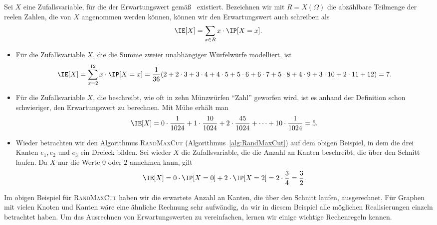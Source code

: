 \documentclass[language=ngerman,algolist]{TemplateLecture}
\begin{document}
Sei $X$ eine Zufallsvariable, für die der Erwartungswert gemäß~ existiert. Bezeichnen wir mit $R = X(\Omega)$ die abzählbare Teilmenge der reelen Zahlen, die von $X$ angenommen werden können, können wir den Erwartungswert auch schreiben als
\begin{equation*}
    \IE[X] = \sum_{x \in R} x \cdot \IP[X = x].
\end{equation*}
\begin{expl}\leavevmode
    \begin{itemize}
        \item Für die Zufallsvariable $X$, die die Summe zweier unabhängiger Würfelwürfe modelliert, ist
        \begin{equation*}
            \IE[X] = \sum_{x=2}^{12} x \cdot \IP[X = x] = \frac{1}{36}(2 + 2 \cdot 3 + 3 \cdot 4 + 4 \cdot 5 + 5 \cdot 6 + 6 \cdot 7 + 5 \cdot 8 + 4 \cdot 9 + 3 \cdot 10 + 2 \cdot 11 + 12) = 7.
        \end{equation*}
        \item Für die Zufallsvariable $X$, die beschreibt, wie oft in zehn Münzwürfen \enquote{Zahl} geworfen wird, ist es anhand der Definition schon schwieriger, den Erwartungswert zu berechnen. Mit Mühe erhält man 
        \begin{equation*}
            \IE[X] = 0 \cdot \frac{1}{1024} + 1 \cdot \frac{10}{1024} + 2 \cdot \frac{45}{1024} + \cdots + 10 \cdot \frac{1}{1024} = 5.
        \end{equation*}
        \item Wieder betrachten wir den Algorithmus \textsc{RandMaxCut} (Algorithmus~\ref{alg:RandMaxCut}) auf dem obigen Beispiel, in dem die drei Kanten $e_1, e_2$ und $e_3$ ein Dreieck bilden. Sei wieder $X$ die Zufallsvariable, die die Anzahl an Kanten beschreibt, die über den Schnitt laufen. Da $X$ nur die Werte $0$ oder $2$ annehmen kann, gilt 
        \begin{equation*}
            \IE[X] = 0 \cdot \IP[X = 0] + 2 \cdot \IP[X = 2] = 2 \cdot \frac{3}{4} = \frac{3}{2}.
        \end{equation*}
    \end{itemize}
\end{expl}
Im obigen Beispiel für \textsc{RandMaxCut} haben wir die erwartete Anzahl an Kanten, die über den Schnitt laufen, ausgerechnet. Für Graphen mit vielen Knoten und Kanten wäre eine ähnliche Rechnung sehr aufwändig, da wir in diesem Beispiel alle möglichen Realisierungen einzeln betrachtet haben. Um das Ausrechnen von Erwartungswerten zu vereinfachen, lernen wir einige wichtige Rechenregeln kennen.
\end{document}
